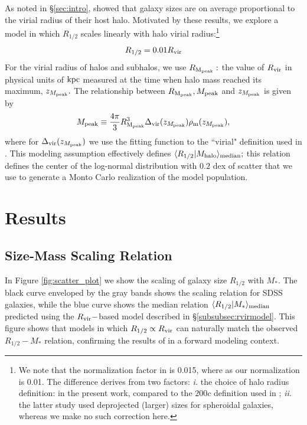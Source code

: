 \documentclass[usenatbib,usegraphicx,letterpaper]{mn2e}
\newcommand{\beq}{\begin{equation}}
\newcommand{\eeq}{\end{equation}}
\newcommand{\rhalf}{R_{1/2}}
\newcommand{\mstar}{M_{\ast}}
\newcommand{\mpeak}{M_{\rm peak}}
\newcommand{\zpeak}{z_{M_{\rm peak}}}
\newcommand{\mhalo}{M_{\rm halo}}
\newcommand{\rvir}{R_{\rm vir}}
\newcommand{\rmpeak}{R_{\rm M_{peak}}}
\newcommand{\median}[2]{\langle{#1}\vert{#2}\rangle_{\rm median}}
\newcommand{\kpc}{{\rm kpc}}
\begin{document}
As noted in \S\ref{sec:intro}, \citet{kravtsov13} showed that galaxy sizes are on average proportional to the virial radius of their host halo. Motivated by these results, we  explore a model in which $\rhalf$ scales linearly with halo virial radius:\footnote{We note that the normalization factor in \citet{kravtsov13} is 0.015, where as our normalization is 0.01. The difference derives from two factors: {\em i.} the choice of halo radius definition: \citet{bryan_norman98} in the present work, compared to the $200c$ definition used in \citet{kravtsov13}; {\em ii.} the latter study used deprojected (larger) sizes for spheroidal galaxies, whereas we make no such correction here.}
\beq
\label{eq:fiducial_model}
\rhalf = 0.01\rvir
\eeq
For the virial radius of halos and subhalos, we use $\rmpeak:$ the value of $\rvir$ in physical units of $\kpc$ measured at the time when halo mass reached its maximum, $\zpeak.$  The relationship between $\rmpeak, \mpeak$ and $\zpeak$ is given by
\beq
\mpeak\equiv\frac{4\pi}{3}\rmpeak^{3}\Delta_{\rm vir}(\zpeak)\rho_{\rm m}(\zpeak),
\eeq
where for $\Delta_{\rm vir}(\zpeak)$ we use the fitting function to the ``virial" definition used in \citet{bryan_norman98}. This modeling assumption effectively defines $\median{\rhalf}{\mhalo};$ this relation defines the center of the log-normal distribution with $0.2$ dex of scatter that we use to generate a Monto Carlo realization of the model population.

\section{Results}
\label{sec:results}

\subsection{Size-Mass Scaling Relation}
\label{subsec:one_point_function}

In Figure \ref{fig:scatter_plot} we show the scaling of galaxy size $\rhalf$ with $\mstar.$ The black curve enveloped by the gray bands shows the scaling relation for SDSS galaxies, while the blue curve shows the median relation  $\median{\rhalf}{\mstar}$ predicted using the $\rvir-$based model described in \S\ref{subsubsec:rvirmodel}. This figure shows that models in which $\rhalf\propto\rvir$ can naturally match the observed $\rhalf-\mstar$ relation, confirming the results of \citet{kravtsov13} in a forward modeling context.
\end{document}
